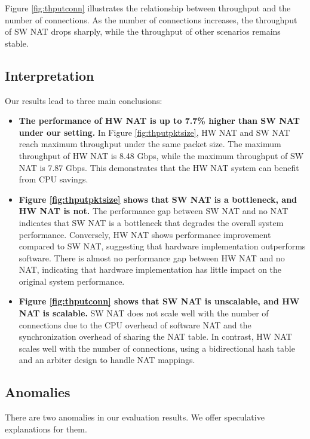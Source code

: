 Figure \ref{fig:thputconn} illustrates the relationship between throughput and the number of connections. As the number of connections increases, the throughput of SW NAT drops sharply, while the throughput of other scenarios remains stable.

\subsection{Interpretation}

Our results lead to three main conclusions:

\begin{itemize}
    \item \textbf{The performance of HW NAT is up to 7.7\% higher than SW NAT under our setting.} In Figure \ref{fig:thputpktsize}, HW NAT and SW NAT reach maximum throughput under the same packet size. The maximum throughput of HW NAT is 8.48 Gbps, while the maximum throughput of SW NAT is 7.87 Gbps. This demonstrates that the HW NAT system can benefit from CPU savings.
    
    \item \textbf{Figure \ref{fig:thputpktsize} shows that SW NAT is a bottleneck, and HW NAT is not.} The performance gap between SW NAT and no NAT indicates that SW NAT is a bottleneck that degrades the overall system performance. Conversely, HW NAT shows performance improvement compared to SW NAT, suggesting that hardware implementation outperforms software. There is almost no performance gap between HW NAT and no NAT, indicating that hardware implementation has little impact on the original system performance.
    
    \item \textbf{Figure \ref{fig:thputconn} shows that SW NAT is unscalable, and HW NAT is scalable.} SW NAT does not scale well with the number of connections due to the CPU overhead of software NAT and the synchronization overhead of sharing the NAT table. In contrast, HW NAT scales well with the number of connections, using a bidirectional hash table and an arbiter design to handle NAT mappings.
\end{itemize}

\subsection{Anomalies}

There are two anomalies in our evaluation results. We offer speculative explanations for them.

